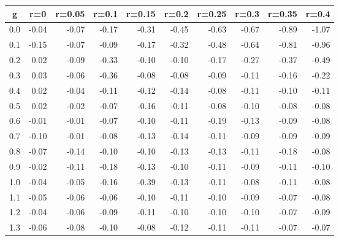 %
\begin{table}[!tbp]
 \begin{center}
 \begin{tabular}{rrrrrrrrrr}\hline\hline
\multicolumn{1}{c}{g}&\multicolumn{1}{c}{r=0}&\multicolumn{1}{c}{r=0.05}&\multicolumn{1}{c}{r=0.1}&\multicolumn{1}{c}{r=0.15}&\multicolumn{1}{c}{r=0.2}&\multicolumn{1}{c}{r=0.25}&\multicolumn{1}{c}{r=0.3}&\multicolumn{1}{c}{r=0.35}&\multicolumn{1}{c}{r=0.4}\tabularnewline
\hline
0.0&-0.04&-0.07&-0.17&-0.31&-0.45&-0.63&-0.67&-0.89&-1.07\tabularnewline
0.1&-0.15&-0.07&-0.09&-0.17&-0.32&-0.48&-0.64&-0.81&-0.96\tabularnewline
0.2& 0.02&-0.09&-0.33&-0.10&-0.10&-0.17&-0.27&-0.37&-0.49\tabularnewline
0.3& 0.03&-0.06&-0.36&-0.08&-0.08&-0.09&-0.11&-0.16&-0.22\tabularnewline
0.4& 0.02&-0.04&-0.11&-0.12&-0.14&-0.08&-0.11&-0.10&-0.11\tabularnewline
0.5& 0.02&-0.02&-0.07&-0.16&-0.11&-0.08&-0.10&-0.08&-0.08\tabularnewline
0.6&-0.01&-0.01&-0.07&-0.10&-0.11&-0.19&-0.13&-0.09&-0.08\tabularnewline
0.7&-0.10&-0.01&-0.08&-0.13&-0.14&-0.11&-0.09&-0.09&-0.09\tabularnewline
0.8&-0.07&-0.14&-0.10&-0.10&-0.13&-0.13&-0.11&-0.18&-0.08\tabularnewline
0.9&-0.02&-0.11&-0.18&-0.13&-0.10&-0.11&-0.09&-0.11&-0.10\tabularnewline
1.0&-0.04&-0.05&-0.16&-0.39&-0.13&-0.11&-0.08&-0.11&-0.08\tabularnewline
1.1&-0.05&-0.06&-0.06&-0.10&-0.11&-0.10&-0.09&-0.07&-0.08\tabularnewline
1.2&-0.04&-0.06&-0.09&-0.11&-0.10&-0.10&-0.10&-0.07&-0.09\tabularnewline
1.3&-0.06&-0.08&-0.10&-0.08&-0.12&-0.11&-0.11&-0.07&-0.07\tabularnewline
\hline
\end{tabular}

\end{center}

\end{table}

